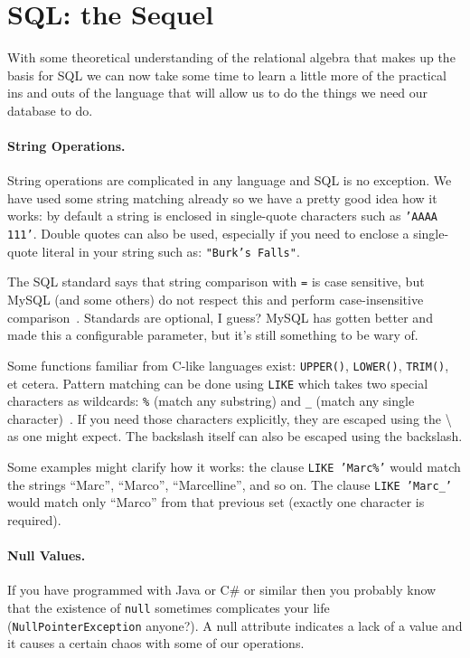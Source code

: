 




\section*{SQL: the Sequel}
With some theoretical understanding of the relational algebra that makes up the basis for SQL we can now take some time to learn a little more of the practical ins and outs of the language that will allow us to do the things we need our database to do. 

\paragraph{String Operations.} String operations are complicated in any language and SQL is no exception. We have used some string matching already so we have a pretty good idea how it works: by default a string is enclosed in single-quote characters such as \texttt{'AAAA 111'}. Double quotes can also be used, especially if you need to enclose a single-quote literal in your string such as: \texttt{"Burk's Falls"}.

The SQL standard says that string comparison with \texttt{=} is case sensitive, but MySQL (and some others) do not respect this and perform case-insensitive comparison~\cite{dsc}. Standards are optional, I guess? MySQL has gotten better and made this a configurable parameter, but it's still something to be wary of.

Some functions familiar from C-like languages exist: \texttt{UPPER()}, \texttt{LOWER()}, \texttt{TRIM()}, et cetera. Pattern matching can be done using \texttt{LIKE} which takes two special characters as wildcards: \texttt{\%} (match any substring) and \texttt{\_} (match any single character)~\cite{dsc}.  If you need those characters explicitly, they are escaped using the \textbackslash~ as one might expect. The backslash itself can also be escaped using the backslash.

Some examples might clarify how it works: the clause \texttt{LIKE 'Marc\%'} would match the strings ``Marc'', ``Marco'', ``Marcelline'', and so on. The clause \texttt{LIKE 'Marc\_'} would match only ``Marco'' from that previous set (exactly one character is required). 


\paragraph{Null Values.} If you have programmed with Java or C\# or similar then you probably know that the existence of \texttt{null} sometimes complicates your life (\texttt{NullPointerException} anyone?). A null attribute indicates a lack of a value and it causes a certain chaos with some of our operations.

